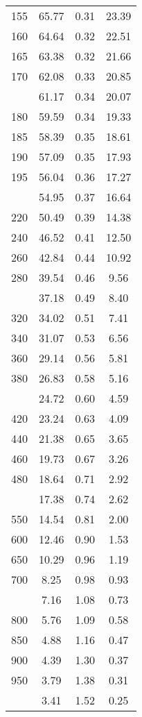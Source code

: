 \begin{table}[ht]
\begin{tabular}{lccc}
  155 & 65.77 & 0.31 & 23.39 \\ 
  160 & 64.64 & 0.32 & 22.51 \\ 
  165 & 63.38 & 0.32 & 21.66 \\ 
  170 & 62.08 & 0.33 & 20.85 \\ 
   \addlinespace
175 & 61.17 & 0.34 & 20.07 \\ 
  180 & 59.59 & 0.34 & 19.33 \\ 
  185 & 58.39 & 0.35 & 18.61 \\ 
  190 & 57.09 & 0.35 & 17.93 \\ 
  195 & 56.04 & 0.36 & 17.27 \\ 
   \addlinespace
200 & 54.95 & 0.37 & 16.64 \\ 
  220 & 50.49 & 0.39 & 14.38 \\ 
  240 & 46.52 & 0.41 & 12.50 \\ 
  260 & 42.84 & 0.44 & 10.92 \\ 
  280 & 39.54 & 0.46 & 9.56 \\ 
   \addlinespace
300 & 37.18 & 0.49 & 8.40 \\ 
  320 & 34.02 & 0.51 & 7.41 \\ 
  340 & 31.07 & 0.53 & 6.56 \\ 
  360 & 29.14 & 0.56 & 5.81 \\ 
  380 & 26.83 & 0.58 & 5.16 \\ 
   \addlinespace
400 & 24.72 & 0.60 & 4.59 \\ 
  420 & 23.24 & 0.63 & 4.09 \\ 
  440 & 21.38 & 0.65 & 3.65 \\ 
  460 & 19.73 & 0.67 & 3.26 \\ 
  480 & 18.64 & 0.71 & 2.92 \\ 
   \addlinespace
500 & 17.38 & 0.74 & 2.62 \\ 
  550 & 14.54 & 0.81 & 2.00 \\ 
  600 & 12.46 & 0.90 & 1.53 \\ 
  650 & 10.29 & 0.96 & 1.19 \\ 
  700 & 8.25 & 0.98 & 0.93 \\ 
   \addlinespace
750 & 7.16 & 1.08 & 0.73 \\ 
  800 & 5.76 & 1.09 & 0.58 \\ 
  850 & 4.88 & 1.16 & 0.47 \\ 
  900 & 4.39 & 1.30 & 0.37 \\ 
  950 & 3.79 & 1.38 & 0.31 \\ 
   \addlinespace
1000 & 3.41 & 1.52 & 0.25 \\ 
   \bottomrule
\end{tabular}
\end{table}
